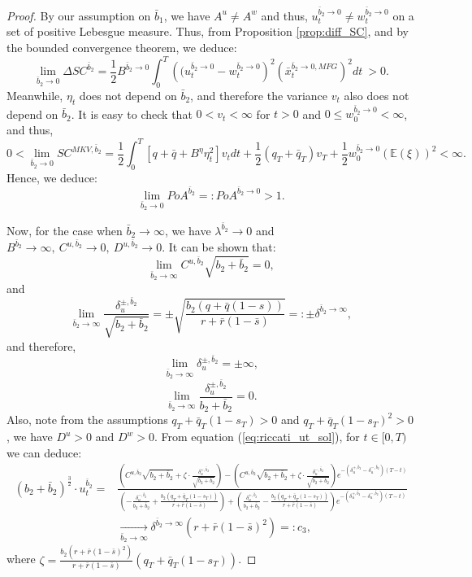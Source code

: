 \documentclass[11pt]{article}
\begin{document}
\begin{proof}
   	By our assumption on $\bar{b}_1$, we have $A^u \neq A^w$ and thus, $u^{\bar{b}_2 \to 0}_t\neq w^{\bar{b}_2 \to 0}_t$ on a set of positive Lebesgue measure. Thus, from Proposition \ref{prop:diff_SC}, and by the bounded convergence theorem, we deduce:
	$$ \lim_{\bar{b}_2 \to 0} \Delta SC^{\bar{b}_2} = \frac{1}{2} B^{\bar{b}_2 \to 0} \int_0^T \left( (u_t^{\bar{b}_2 \to 0} - w_t^{\bar{b}_2 \to 0}\right)^2 \left (\bar{x}_t^{\bar{b}_2 \to 0,MFG} \right)^2 dt \  > 0. $$
	Meanwhile, $\eta_t$ does not depend on $\bar{b}_2$, and therefore the variance $v_t$ also does not depend on $\bar{b}_2$. It is easy to check that $0<v_t<\infty$ for $t>0$ and $0 \leq w^{\bar{b}_2 \to 0}_0 < \infty$, and thus,
	\begin{equation*}
	    0<\lim_{\bar{b}_2 \to 0}SC^{MKV,\bar{b}_2} = \frac{1}{2}\int_0^T \left[q+\bar{q} + B^{\eta} \eta_t^2 \right] v_t dt + \frac{1}{2}(q_T + \bar{q}_T) v_T + \frac{1}{2}w^{\bar{b}_2 \to 0}_0 (\mathbb{E}(\xi))^2<\infty.     
	\end{equation*}
	Hence, we deduce:
	$$ \lim_{\bar{b}_2 \to 0} PoA^{\bar{b}_2} =: PoA^{\bar{b}_2 \to 0} > 1. $$
	
	Now, for the case when $\bar{b}_2 \to \infty$,  we have $\lambda^{\bar{b}_2} \to 0$
	and $B^{\bar{b}_2} \to \infty,\ C^{u,\bar{b}_2} \to 0,\ D^{u,\bar{b}_2} \to 0$. It can be shown that:
	$$\lim_{\bar{b}_2 \to \infty}C^{u,\bar{b}_2}\sqrt{b_2+\bar{b}_2}=0,$$
	and
	$$ \lim_{\bar{b}_2 \to \infty} \frac{\delta^{\pm,\bar{b}_2}_u}{\sqrt{b_2 + \bar{b}_2}} =\pm \sqrt{ \frac{b_2 (q + \bar{q}(1-s))}{r + \bar{r}(1-\bar{s})} } =: \pm \delta^{\bar{b}_2 \to \infty},$$
	and therefore,
	$$\lim_{\bar{b}_2 \to \infty} \delta^{\pm,\bar{b}_2}_u=\pm \infty,$$
	$$\lim_{\bar{b}_2 \to \infty} \frac{\delta^{\pm,\bar{b}_2}_u}{b_2 + \bar{b}_2}=0.$$
	Also, note from the assumptions $q_T+\bar{q}_T(1-s_T)>0$ and $q_T+\bar{q}_T(1-s_T)^2>0$, we have $D^u>0$ and $D^w>0$. From equation (\ref{eq:riccati_ut_sol}), for $t \in [0,T)$ we can deduce:
	\begin{equation*}
	\begin{split}
	 	(b_2 + \bar{b}_2)^{\frac{3}{2}}\cdot u^{\bar{b}_2}_t =& \frac{ \left( C^{u,\bar{b}_2}\sqrt{b_2 + \bar{b}_2} + \zeta \cdot \frac{\delta^{+,\bar{b}_2}_u}{\sqrt{b_2 + \bar{b}_2}}  \right) - \left( C^{u,\bar{b}_2}\sqrt{b_2 + \bar{b}_2} + \zeta \cdot \frac{\delta^{-,\bar{b}_2}_u}{\sqrt{b_2 + \bar{b}_2}}  \right) e^{- (\delta^{+,\bar{b}_2}_u - \delta^{-,\bar{b}_2}_u)(T-t)}}{ \left(- \frac{\delta^{-,\bar{b}_2}_u}{b_2 + \bar{b}_2} + \frac{b_2 (q_T + \bar{q}_T (1-s_T) )}{r + \bar{r}(1-\bar{s})} \right) + \left( \frac{\delta^{+,\bar{b}_2}_u}{b_2 + \bar{b}_2} - \frac{b_2 (q_T + \bar{q}_T (1-s_T) )}{r + \bar{r}(1-\bar{s})} \right)e^{- (\delta^{+,\bar{b}_2}_u - \delta^{-,\bar{b}_2}_u)(T-t)} }\\
	 	& \xrightarrow[\bar{b}_2 \to \infty]{} \delta^{\bar{b}_2 \to \infty} (r + \bar{r}(1-\bar{s})^2)=: c_3,
	 \end{split} 
	\end{equation*}
	where $\zeta = \frac{b_2 (r + \bar{r}(1-\bar{s})^2) }{r+ \bar{r}(1-\bar{s})} (q_T + \bar{q}_T(1-s_T))$. 
	


\end{proof}
\end{document}
